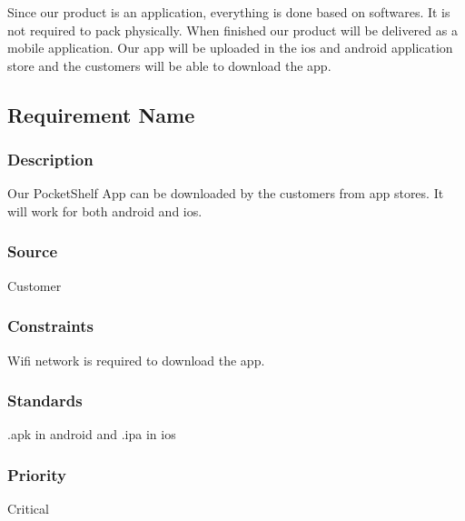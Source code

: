 Since our product is an application, everything is done based on softwares. It is not required to pack physically. When finished our product will be delivered as a mobile application. Our app will be uploaded in the ios and android application store and the customers will be able to download the app.

\subsection{Requirement Name}
\subsubsection{Description}
Our PocketShelf App can be downloaded by the customers from app stores. It will work for both android and ios.
\subsubsection{Source}
Customer
\subsubsection{Constraints}
Wifi network is required to download the app.
\subsubsection{Standards}
.apk in android and .ipa in ios
\subsubsection{Priority}
Critical